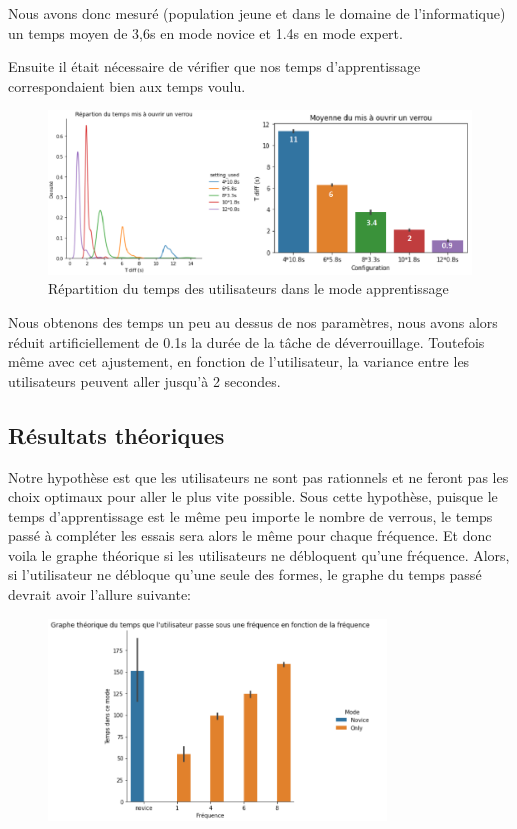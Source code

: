 \documentclass[a4paper, 12pt]{report}
\begin{document}
        Nous avons donc mesuré (population jeune et dans le domaine de l'informatique) un temps moyen de 
        3,6s en mode novice et 1.4s en mode expert.
        
        Ensuite il était nécessaire de vérifier que nos temps d'apprentissage correspondaient bien 
        aux temps voulu.
        \begin{figure}[H]
            \centering
            \includegraphics[width=1\textwidth]{img/fig5.png}
            \caption{Répartition du temps des utilisateurs dans le mode apprentissage}
        \end{figure}
        
        Nous obtenons des temps un peu au dessus de nos paramètres, nous avons alors réduit 
        artificiellement de 0.1s la durée de la tâche de déverrouillage.
        Toutefois même avec cet ajustement, en fonction de l'utilisateur, la variance entre les utilisateurs peuvent aller jusqu'à 2 secondes.
        
        \subsection{Résultats théoriques}
        Notre hypothèse est que les utilisateurs ne sont pas rationnels et ne feront pas les choix 
        optimaux pour aller le plus vite possible. Sous cette hypothèse, puisque le temps 
        d'apprentissage est le même peu importe le nombre de verrous, le temps passé à compléter les 
        essais sera alors le même pour chaque fréquence.
        Et donc voila le graphe théorique si les utilisateurs ne débloquent qu'une fréquence.
        Alors, si l'utilisateur ne débloque qu'une seule des formes, le graphe du temps passé devrait
        avoir l'allure suivante:
        
        \begin{figure}[H]
            \centering
            \includegraphics[width=0.8\textwidth]{img/fig6.png}
        \end{figure}
        
\end{document}
